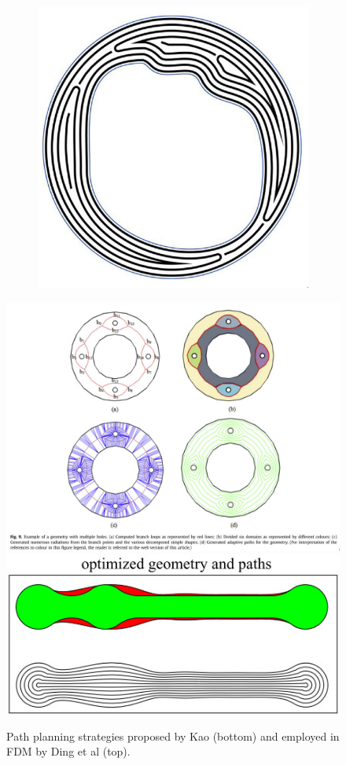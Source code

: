 \begin{figure}
\begin{subfigure}{0.45\columnwidth}
\includegraphics[width=\columnwidth]{sources/related_work/jin.jpg}
\caption{\citeauthor{Jin2017}}
\label{jin}
\end{subfigure}
\end{figure}

\begin{figure}
\centering
\includegraphics[width=\columnwidth]{sources/related_work/ding.jpg}
\includegraphics[width=.7\columnwidth]{sources/related_work/kao.jpg}
\caption{Path planning strategies proposed by Kao (bottom) and employed in FDM by Ding et al (top).}
\label{ding}
\end{figure}